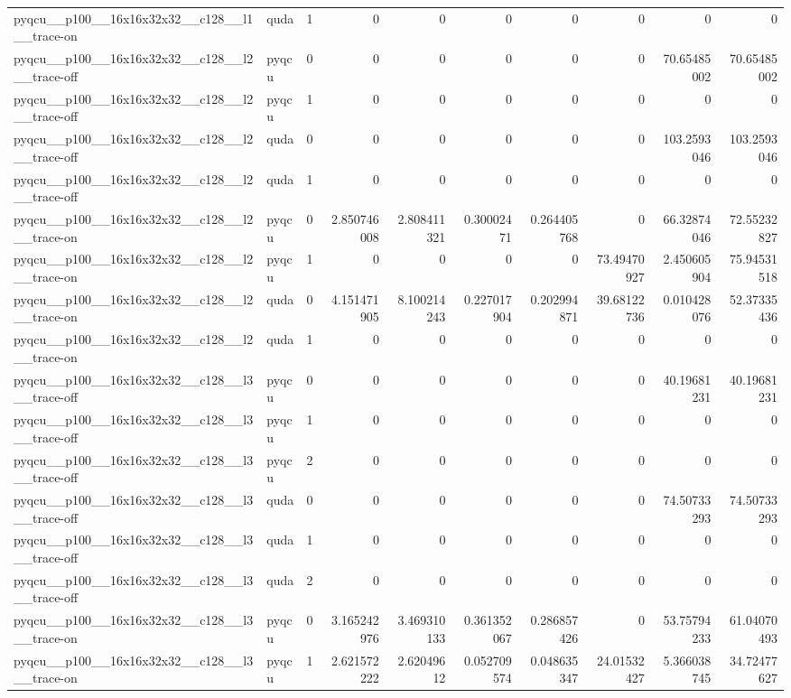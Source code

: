 \begin{table}[htbp]
\begin{tabular}{@{}llrrrrrrrr@{}}
pyqcu\_\_p100\_\_16x16x32x32\_\_c128\_\_l1\_\_trace-on & quda & 1 & 0 & 0 & 0 & 0 & 0 & 0 & 0 \\
pyqcu\_\_p100\_\_16x16x32x32\_\_c128\_\_l2\_\_trace-off & pyqcu & 0 & 0 & 0 & 0 & 0 & 0 & 70.65485002 & 70.65485002 \\
pyqcu\_\_p100\_\_16x16x32x32\_\_c128\_\_l2\_\_trace-off & pyqcu & 1 & 0 & 0 & 0 & 0 & 0 & 0 & 0 \\
pyqcu\_\_p100\_\_16x16x32x32\_\_c128\_\_l2\_\_trace-off & quda & 0 & 0 & 0 & 0 & 0 & 0 & 103.2593046 & 103.2593046 \\
pyqcu\_\_p100\_\_16x16x32x32\_\_c128\_\_l2\_\_trace-off & quda & 1 & 0 & 0 & 0 & 0 & 0 & 0 & 0 \\
pyqcu\_\_p100\_\_16x16x32x32\_\_c128\_\_l2\_\_trace-on & pyqcu & 0 & 2.850746008 & 2.808411321 & 0.30002471 & 0.264405768 & 0 & 66.32874046 & 72.55232827 \\
pyqcu\_\_p100\_\_16x16x32x32\_\_c128\_\_l2\_\_trace-on & pyqcu & 1 & 0 & 0 & 0 & 0 & 73.49470927 & 2.450605904 & 75.94531518 \\
pyqcu\_\_p100\_\_16x16x32x32\_\_c128\_\_l2\_\_trace-on & quda & 0 & 4.151471905 & 8.100214243 & 0.227017904 & 0.202994871 & 39.68122736 & 0.010428076 & 52.37335436 \\
pyqcu\_\_p100\_\_16x16x32x32\_\_c128\_\_l2\_\_trace-on & quda & 1 & 0 & 0 & 0 & 0 & 0 & 0 & 0 \\
pyqcu\_\_p100\_\_16x16x32x32\_\_c128\_\_l3\_\_trace-off & pyqcu & 0 & 0 & 0 & 0 & 0 & 0 & 40.19681231 & 40.19681231 \\
pyqcu\_\_p100\_\_16x16x32x32\_\_c128\_\_l3\_\_trace-off & pyqcu & 1 & 0 & 0 & 0 & 0 & 0 & 0 & 0 \\
pyqcu\_\_p100\_\_16x16x32x32\_\_c128\_\_l3\_\_trace-off & pyqcu & 2 & 0 & 0 & 0 & 0 & 0 & 0 & 0 \\
pyqcu\_\_p100\_\_16x16x32x32\_\_c128\_\_l3\_\_trace-off & quda & 0 & 0 & 0 & 0 & 0 & 0 & 74.50733293 & 74.50733293 \\
pyqcu\_\_p100\_\_16x16x32x32\_\_c128\_\_l3\_\_trace-off & quda & 1 & 0 & 0 & 0 & 0 & 0 & 0 & 0 \\
pyqcu\_\_p100\_\_16x16x32x32\_\_c128\_\_l3\_\_trace-off & quda & 2 & 0 & 0 & 0 & 0 & 0 & 0 & 0 \\
pyqcu\_\_p100\_\_16x16x32x32\_\_c128\_\_l3\_\_trace-on & pyqcu & 0 & 3.165242976 & 3.469310133 & 0.361352067 & 0.286857426 & 0 & 53.75794233 & 61.04070493 \\
pyqcu\_\_p100\_\_16x16x32x32\_\_c128\_\_l3\_\_trace-on & pyqcu & 1 & 2.621572222 & 2.62049612 & 0.052709574 & 0.048635347 & 24.01532427 & 5.366038745 & 34.72477627 \\

\end{tabular}
\end{table}

